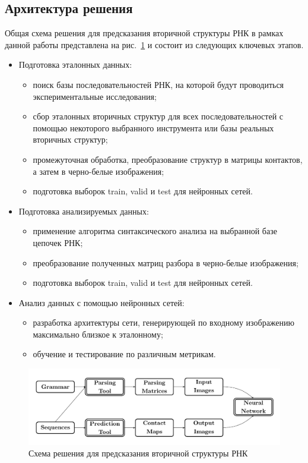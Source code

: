 \documentclass[14pt]{matmex-diploma-custom}
\begin{document}
\subsection{Архитектура решения}
Общая схема решения для предсказания вторичной структуры РНК в рамках данной работы представлена на рис.~\ref{schema} и состоит из следующих ключевых этапов.
\begin{itemize}
    \item Подготовка эталонных данных:
    \begin{itemize}
        \item поиск базы последовательностей РНК, на которой будут проводиться экспериментальные исследования;
        \item сбор эталонных вторичных структур для всех последовательностей с помощью некоторого выбранного инструмента или базы реальных вторичных структур;
        \item промежуточная обработка, преобразование структур в матрицы контактов, а затем в черно-белые изображения;
        \item подготовка выборок train, valid и test для нейронных сетей.
    \end{itemize}
    \item Подготовка анализируемых данных:
    \begin{itemize}
        \item применение алгоритма синтаксического анализа на выбранной базе цепочек РНК;
        \item преобразование полученных матриц разбора в черно-белые изображения;
        \item подготовка выборок train, valid и test для нейронных сетей.
    \end{itemize}
    \item Анализ данных с помощью нейронных сетей:
    \begin{itemize}
        \item разработка архитектуры сети, генерирующей по входному изображению максимально близкое к эталонному;
        \item обучение и тестирование по различным метрикам.
    \end{itemize}
\end{itemize}

\begin{figure}[h]
\begin{center}
\centering
\includegraphics[width=16cm]{pics/schema.pdf}
\caption{Схема решения для предсказания вторичной структуры РНК}
\label{schema}
\end{center}
\end{figure} 
\end{document}
